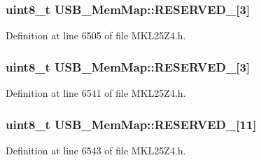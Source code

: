 \subsubsection[{\texorpdfstring{R\+E\+S\+E\+R\+V\+E\+D\+\_\+2}{RESERVED_2}}]{\setlength{\rightskip}{0pt plus 5cm}uint8\+\_\+t U\+S\+B\+\_\+\+Mem\+Map\+::\+R\+E\+S\+E\+R\+V\+E\+D\+\_\mbox{[}3\mbox{]}}\hypertarget{struct_u_s_b___mem_map_a0a53453a4001c42a5cceb359c68097cc}{}\label{struct_u_s_b___mem_map_a0a53453a4001c42a5cceb359c68097cc}


Definition at line 6505 of file M\+K\+L25\+Z4.\+h.

\subsubsection[{\texorpdfstring{R\+E\+S\+E\+R\+V\+E\+D\+\_\+20}{RESERVED_20}}]{\setlength{\rightskip}{0pt plus 5cm}uint8\+\_\+t U\+S\+B\+\_\+\+Mem\+Map\+::\+R\+E\+S\+E\+R\+V\+E\+D\+\_\mbox{[}3\mbox{]}}\hypertarget{struct_u_s_b___mem_map_a443f87251df6c05ff456e604ca853052}{}\label{struct_u_s_b___mem_map_a443f87251df6c05ff456e604ca853052}


Definition at line 6541 of file M\+K\+L25\+Z4.\+h.

\subsubsection[{\texorpdfstring{R\+E\+S\+E\+R\+V\+E\+D\+\_\+21}{RESERVED_21}}]{\setlength{\rightskip}{0pt plus 5cm}uint8\+\_\+t U\+S\+B\+\_\+\+Mem\+Map\+::\+R\+E\+S\+E\+R\+V\+E\+D\+\_\mbox{[}11\mbox{]}}\hypertarget{struct_u_s_b___mem_map_a3fd06de5424ba76a2ad43d024b8602cd}{}\label{struct_u_s_b___mem_map_a3fd06de5424ba76a2ad43d024b8602cd}


Definition at line 6543 of file M\+K\+L25\+Z4.\+h.

